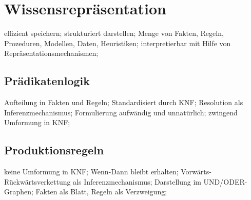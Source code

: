 \documentclass[german,color,6pt]{latex4ei/latex4ei_sheet}
\begin{document}
\section{Wissensrepräsentation}
\begin{symbolbox}
	effizient speichern; strukturiert darstellen; Menge von Fakten, Regeln, Prozeduren, Modellen, Daten, Heuristiken; interpretierbar mit Hilfe von Repräsentationsmechanismen;
\end{symbolbox}

\begin{sectionbox}
\subsection{Prädikatenlogik}
Aufteilung in Fakten und Regeln; Standardisiert durch KNF; Resolution als Inferenzmechanismus; Formulierung aufwändig und unnatürlich; zwingend Umformung in KNF;
\end{sectionbox}

\begin{sectionbox}
\subsection{Produktionsregeln}
keine Umformung in KNF; Wenn-Dann bleibt erhalten; Vorwärts- Rückwärtsverkettung als Inferenzmechanismus; Darstellung im UND/ODER-Graphen; Fakten als Blatt, Regeln als Verzweigung;

%
\end{sectionbox}
\end{document}

